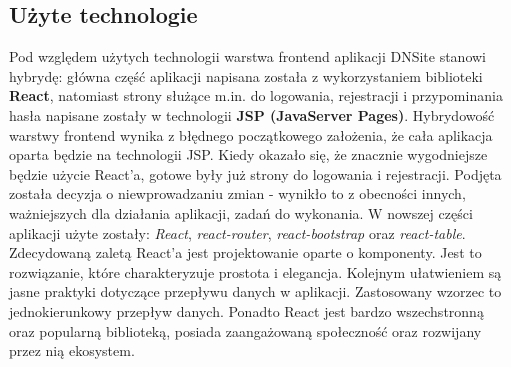 \documentclass[11pt]{article}
\begin{document}
\subsection{Użyte technologie}
Pod względem użytych technologii warstwa frontend aplikacji DNSite stanowi hybrydę: główna część aplikacji napisana została z wykorzystaniem biblioteki \textbf{React}, natomiast strony służące m.in. do logowania, rejestracji i przypominania hasła napisane zostały w technologii \textbf{JSP (JavaServer Pages)}. \newline
Hybrydowość warstwy frontend wynika z błędnego początkowego założenia, że cała aplikacja oparta będzie na technologii JSP. Kiedy okazało się, że znacznie wygodniejsze będzie użycie React'a, gotowe były już strony do logowania i rejestracji. Podjęta została decyzja o niewprowadzaniu zmian - wynikło to z obecności innych, ważniejszych dla działania aplikacji, zadań do wykonania.\newline
W nowszej części aplikacji użyte zostały: \emph{React}, \emph{react-router}, \emph{react-bootstrap} oraz \emph{react-table}. Zdecydowaną zaletą React'a jest projektowanie oparte o komponenty. Jest to rozwiązanie, które charakteryzuje prostota i elegancja. Kolejnym ułatwieniem są jasne praktyki dotyczące przepływu danych w aplikacji. Zastosowany wzorzec to jednokierunkowy przepływ danych. Ponadto React jest bardzo wszechstronną oraz popularną biblioteką, posiada zaangażowaną społeczność oraz rozwijany przez nią ekosystem.
\end{document}
